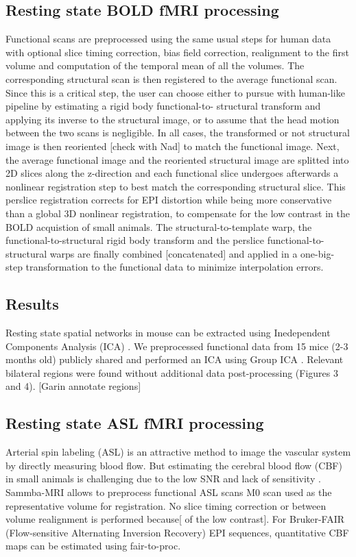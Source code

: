 \documentclass[utf8]{frontiersSCNS} %
\begin{document}
\subsection{Resting state BOLD fMRI processing}
Functional scans are preprocessed using the same usual steps for human data
with optional slice timing correction, bias field correction, realignment to the 
first volume
and computation of the temporal mean of all the volumes.
The corresponding structural scan is then registered to the average functional scan.
Since this is a critical step, the user can choose
either to pursue with human-like pipeline by estimating a rigid body functional-to-
structural transform and applying its inverse to the structural image, or to assume 
that the head motion between the two scans is negligible.
In all cases, the transformed or not structural image is then reoriented [check with Nad]
to match the functional image. Next, the average functional image and
the reoriented structural image are
splitted into 2D slices along the z-direction and each functional slice undergoes
afterwards a nonlinear registration step to best match the corresponding structural slice.
This perslice registration corrects for EPI distortion while being more
conservative than a global 3D nonlinear registration, to compensate for the low
contrast in the BOLD acquistion of small animals.
The structural-to-template warp, the functional-to-structural rigid body transform and the perslice functional-to-structural warps are finally combined 
[concatenated] and applied in a one-big-step transformation
to the functional data to minimize interpolation errors.
\subsection{Results}
Resting state spatial networks in mouse can be extracted using Inedependent Components Analysis (ICA) \citep{zerbi2015mapping, grandjean2019}. We preprocessed functional data
from 15 mice (2-3 months old) publicly shared
\citep{zerbi2015mapping} and performed an ICA using Group ICA 
\citep{varoquaux2010group}. Relevant bilateral
regions were found without additional data post-processing (Figures 3 and 4). [Garin annotate regions]
%
\subsection{Resting state ASL fMRI processing}
Arterial spin labeling (ASL) is an attractive method 
to image the vascular system by directly measuring blood flow.
But estimating the cerebral blood flow (CBF) in small animals is challenging due 
to the low SNR and lack of sensitivity \citep{kober2008experimental}.
Sammba-MRI allows to preprocess functional ASL scans M0 scan used 
as the representative volume for registration. No slice timing correction
or between volume realignment is performed because[ of the low contrast].
For Bruker-FAIR (Flow-sensitive Alternating Inversion Recovery) EPI sequences,
quantitative   CBF   maps can be estimated using fair-to-proc.
%
\end{document}
